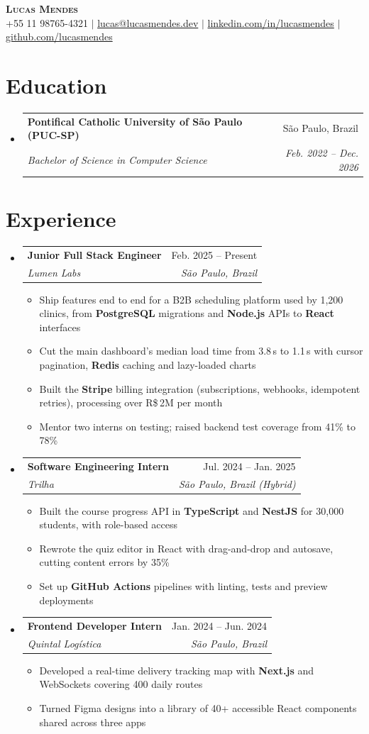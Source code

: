\documentclass[letterpaper,11pt]{article}
\makeatletter
\newcommand{\resumeItem}[1]{
  \item\small{
    {#1 \vspace{-2pt}}
  }
}
\newcommand{\resumeSubheading}[4]{
  \vspace{-2pt}\item
    \begin{tabular*}{0.97\textwidth}[t]{l@{\extracolsep{\fill}}r}
      \textbf{#1} & #2 \\
      \textit{\small#3} & \textit{\small #4} \\
    \end{tabular*}\vspace{-7pt}
}
\newcommand{\resumeSubHeadingListStart}{\begin{itemize}[leftmargin=0.15in, label={}]}
\newcommand{\resumeSubHeadingListEnd}{\end{itemize}}
\newcommand{\resumeItemListStart}{\begin{itemize}}
\newcommand{\resumeItemListEnd}{\end{itemize}\vspace{-5pt}}
\makeatother
\begin{document}
\begin{center}
    \textbf{\Huge \scshape Lucas Mendes} \\ \vspace{1pt}
    \small +55 11 98765-4321 $|$ \underline{lucas@lucasmendes.dev} $|$
    \underline{linkedin.com/in/lucasmendes} $|$ \underline{github.com/lucasmendes}
\end{center}

\section{Education}
  \resumeSubHeadingListStart
    \resumeSubheading
      {Pontifical Catholic University of São Paulo (PUC-SP)}{São Paulo, Brazil}
      {Bachelor of Science in Computer Science}{Feb. 2022 -- Dec. 2026}
  \resumeSubHeadingListEnd

\section{Experience}
  \resumeSubHeadingListStart
    \resumeSubheading
      {Junior Full Stack Engineer}{Feb. 2025 -- Present}
      {Lumen Labs}{São Paulo, Brazil}
      \resumeItemListStart
        \resumeItem{Ship features end to end for a B2B scheduling platform used by 1,200 clinics, from \textbf{PostgreSQL} migrations and \textbf{Node.js} APIs to \textbf{React} interfaces}
        \resumeItem{Cut the main dashboard's median load time from 3.8\,s to 1.1\,s with cursor pagination, \textbf{Redis} caching and lazy-loaded charts}
        \resumeItem{Built the \textbf{Stripe} billing integration (subscriptions, webhooks, idempotent retries), processing over R\$\,2M per month}
        \resumeItem{Mentor two interns on testing; raised backend test coverage from 41\% to 78\%}
      \resumeItemListEnd
    \resumeSubheading
      {Software Engineering Intern}{Jul. 2024 -- Jan. 2025}
      {Trilha}{São Paulo, Brazil (Hybrid)}
      \resumeItemListStart
        \resumeItem{Built the course progress API in \textbf{TypeScript} and \textbf{NestJS} for 30,000 students, with role-based access}
        \resumeItem{Rewrote the quiz editor in React with drag-and-drop and autosave, cutting content errors by 35\%}
        \resumeItem{Set up \textbf{GitHub Actions} pipelines with linting, tests and preview deployments}
      \resumeItemListEnd
    \resumeSubheading
      {Frontend Developer Intern}{Jan. 2024 -- Jun. 2024}
      {Quintal Logística}{São Paulo, Brazil}
      \resumeItemListStart
        \resumeItem{Developed a real-time delivery tracking map with \textbf{Next.js} and WebSockets covering 400 daily routes}
        \resumeItem{Turned Figma designs into a library of 40+ accessible React components shared across three apps}
      \resumeItemListEnd
  \resumeSubHeadingListEnd
\end{document}
